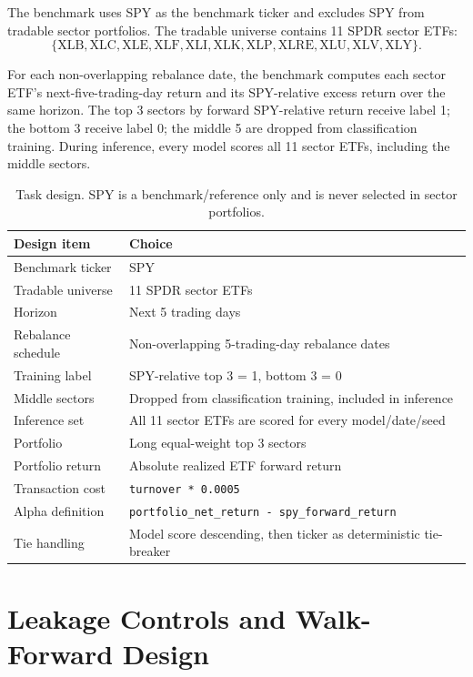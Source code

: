\documentclass[11pt]{article}
\begin{document}
The benchmark uses SPY as the benchmark ticker and excludes SPY from tradable sector portfolios. The tradable universe contains 11 SPDR sector ETFs:
\[
\{\mathrm{XLB}, \mathrm{XLC}, \mathrm{XLE}, \mathrm{XLF}, \mathrm{XLI}, \mathrm{XLK}, \mathrm{XLP}, \mathrm{XLRE}, \mathrm{XLU}, \mathrm{XLV}, \mathrm{XLY}\}.
\]

For each non-overlapping rebalance date, the benchmark computes each sector ETF's next-five-trading-day return and its SPY-relative excess return over the same horizon. The top 3 sectors by forward SPY-relative return receive label 1; the bottom 3 receive label 0; the middle 5 are dropped from classification training. During inference, every model scores all 11 sector ETFs, including the middle sectors.

\begin{table}[H]
\centering
\caption{Task design. SPY is a benchmark/reference only and is never selected in sector portfolios.}
\begin{tabularx}{\textwidth}{@{}lX@{}}
\toprule
\textbf{Design item} & \textbf{Choice} \\
\midrule
Benchmark ticker & SPY \\
Tradable universe & 11 SPDR sector ETFs \\
Horizon & Next 5 trading days \\
Rebalance schedule & Non-overlapping 5-trading-day rebalance dates \\
Training label & SPY-relative top 3 = 1, bottom 3 = 0 \\
Middle sectors & Dropped from classification training, included in inference \\
Inference set & All 11 sector ETFs are scored for every model/date/seed \\
Portfolio & Long equal-weight top 3 sectors \\
Portfolio return & Absolute realized ETF forward return \\
Transaction cost & \texttt{turnover * 0.0005} \\
Alpha definition & \texttt{portfolio\_net\_return - spy\_forward\_return} \\
Tie handling & Model score descending, then ticker as deterministic tie-breaker \\
\bottomrule
\end{tabularx}
\end{table}

\section{Leakage Controls and Walk-Forward Design}
\end{document}
